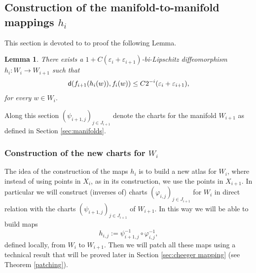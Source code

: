 \documentclass[11pt]{article}
\newcommand{\eps}{\varepsilon}
\newcommand{\sfd}{{\sf d}}
\renewcommand{\phi}{\varphi}
\theoremstyle{plain}
\newtheorem{lemma}[theorem]{Lemma}
\theoremstyle{definition}
\numberwithin{equation}{section}
\begin{document}
\subsection{Construction of the manifold-to-manifold mappings \texorpdfstring{$h_i$}{hi}}\label{sec:manifoldtomanifold}



This section is devoted to to proof the following Lemma.
\begin{lemma}\label{mainh}
	There exists a $1+C(\eps_i+\eps_{i+1})$-bi-Lipschitz diffeomorphism $h_i : W_i \to W_{i+1}$ such that 
	\begin{equation}\label{point4eq}
		\sfd(f_{i+1}(h_i(w)),f_i(w))\le C 2^{-i}(\eps_i+\eps_{i+1}), 
	\end{equation}
	for every $w \in W_i.$
\end{lemma}

Along this section $(\psi_{i+1,j})_{j\in J_{i+1}}$ denote the charts for the manifold $W_{i+1}$ as defined in Section \ref{sec:manifolds}.

\subsubsection{Construction of the new charts for \texorpdfstring{$W_i$}{Wi}}\label{sec:new charts}
The idea of the construction of the maps $h_i$ is to build a new atlas for $W_i$, where instead of using points in $X_i$, as in its construction, we use the points in $X_{i+1}.$ In particular we will construct (inverses of) charts $(\phi_{i,j})_{j\in J_{i+1}}$ for $W_{i}$ in direct relation with the charts $(\psi_{i+1,j})_{j\in J_{i+1}}$ of $W_{i+1}$. In this way we will be able to build maps 
$$h_{i,j}:=\psi_{i+1,j}^{-1}\circ \phi_{i,j}^{-1},$$
defined locally,  from $W_i$ to $W_{i+1}$. Then we  will patch all these maps using a technical result that will be proved later in Section \ref{sec:cheeger mapping} (see Theorem \ref{patching}).\\
\end{document}
